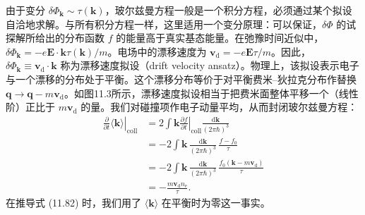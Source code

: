 由于变分 $\delta\Phi_{\mathbf{k}}\sim\tau(\mathbf{k})$，玻尔兹曼方程一般是一个积分方程，必须通过某个拟设自洽地求解。与所有积分方程一样，这里适用一个变分原理：可以保证，$\delta\Phi$ 的试探解所给出的分布函数 $f$ 的能量高于真实基态能量。在弛豫时间近似中，$\delta\Phi_{\mathbf{k}}=-e\mathbf{E}\cdot\mathbf{k}\tau(\mathbf{k})/m$。电场中的漂移速度为 $\mathbf{v}_{\mathrm{d}}=-e\mathbf{E}\tau/m$。因此，$\delta\Phi_{\mathbf{k}}\equiv\mathbf{v}_{\mathrm{d}}\cdot\mathbf{k}$ 称为漂移速度拟设（drift velocity ansatz）。物理上，该拟设表示电子与一个漂移的分布处于平衡。这个漂移分布等价于对平衡费米–狄拉克分布作替换 $\mathbf{q}\to\mathbf{q}-m\mathbf{v}_{\mathrm{d}}$。如图11.3所示，漂移速度拟设相当于把费米面整体平移一个（线性阶）正比于 $m\mathbf{v}_{\mathrm{d}}$ 的量。我们对碰撞项作电子动量平均，从而封闭玻尔兹曼方程：
\begin{align*}
\left.\frac{\partial}{\partial t}\langle\mathbf{k}\rangle\right|_{\mathrm{coll}}&=2\int\mathbf{k}\left.\frac{\partial f}{\partial t}\right|_{\mathrm{coll}}\frac{\mathrm{d}\mathbf{k}}{(2\pi\hbar)^3}\\
&=-2\int\mathbf{k}\,\frac{\mathrm{d}\mathbf{k}}{(2\pi\hbar)^3}\,\frac{f-f_0}{\tau}\\
&=-2\int\mathbf{k}\,\frac{\mathrm{d}\mathbf{k}}{(2\pi\hbar)^3}\,\frac{f_0(\mathbf{k}-m\mathbf{v}_{\mathrm{d}})}{\tau}\\
&=-\frac{m\mathbf{v}_{\mathrm{d}}n_{\mathrm{e}}}{\tau}.\tag{11.82}
\end{align*}
在推导式 (11.82) 时，我们用了 $\langle\mathbf{k}\rangle$ 在平衡时为零这一事实。

